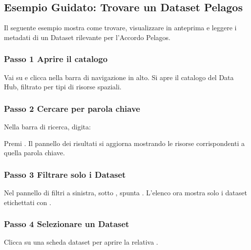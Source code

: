 \documentclass[letterpaper,10pt,english]{sphinxmanual}
\begin{document}
\subsection{Esempio Guidato: Trovare un Dataset Pelagos}
\label{\detokenize{it/02_trovare_visualizzare:esempio-guidato-trovare-un-dataset-pelagos}}
\sphinxAtStartPar
Il seguente esempio mostra come trovare, visualizzare in anteprima e leggere i metadati
di un Dataset rilevante per l’Accordo Pelagos.


\subsubsection{Passo 1 \textendash{} Aprire il catalogo}
\label{\detokenize{it/02_trovare_visualizzare:passo-1-aprire-il-catalogo}}
\sphinxAtStartPar
Vai su  e clicca  nella barra di navigazione in alto.
Si apre il catalogo del Data Hub, filtrato per tipi di risorse spaziali.


\subsubsection{Passo 2 \textendash{} Cercare per parola chiave}
\label{\detokenize{it/02_trovare_visualizzare:passo-2-cercare-per-parola-chiave}}
\sphinxAtStartPar
Nella barra di ricerca, digita:

\begin{sphinxVerbatim}[commandchars=\\\{\}]
 
\end{sphinxVerbatim}

\sphinxAtStartPar
Premi . Il pannello dei risultati si aggiorna mostrando le risorse corrispondenti
a quella parola chiave.


\subsubsection{Passo 3 \textendash{} Filtrare solo i Dataset}
\label{\detokenize{it/02_trovare_visualizzare:passo-3-filtrare-solo-i-dataset}}
\sphinxAtStartPar
Nel pannello di filtri a sinistra, sotto , spunta .
L’elenco ora mostra solo i dataset etichettati con .


\subsubsection{Passo 4 \textendash{} Selezionare un Dataset}
\label{\detokenize{it/02_trovare_visualizzare:passo-4-selezionare-un-dataset}}
\sphinxAtStartPar
Clicca su una scheda dataset per aprire la relativa .
\end{document}

